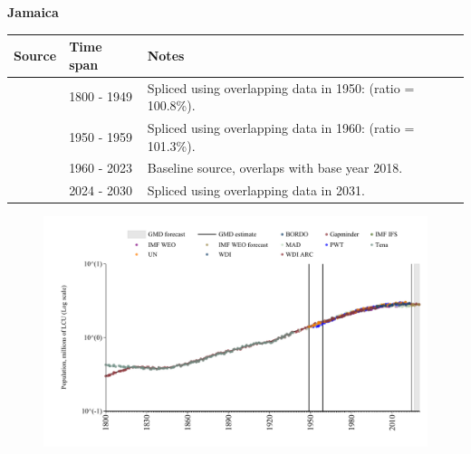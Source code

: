 \documentclass[12pt,a4paper,landscape]{article}
\begin{document}
\begin{adjustbox}{max totalsize={\paperwidth}{\paperheight},center}
\begin{minipage}[t][\textheight][t]{\textwidth}
\vspace*{0.5cm}
{}
\begin{center}
{\Large\bfseries Jamaica}
\end{center}
\vspace{0.5cm}
\begin{table}[H]
\centering
\small
\begin{tabular}{|l|l|l|}
\hline
\textbf{Source} & \textbf{Time span} & \textbf{Notes} \\
\hline
\rowcolor{white}\cite{Gapminder}& 1800 - 1949 &Spliced using overlapping data in 1950: (ratio = 100.8\%).\\
\rowcolor{lightgray}\cite{IMF_IFS}& 1950 - 1959 &Spliced using overlapping data in 1960: (ratio = 101.3\%).\\
\rowcolor{white}\cite{WDI}& 1960 - 2023 &Baseline source, overlaps with base year 2018.\\
\rowcolor{lightgray}\cite{Gapminder}& 2024 - 2030 &Spliced using overlapping data in 2031.\\
\hline
\end{tabular}
\end{table}
\begin{figure}[H]
\centering
\includegraphics[width=\textwidth,height=0.6\textheight,keepaspectratio]{graphs/JAM_pop.pdf}
\end{figure}
\end{minipage}
\end{adjustbox}
\end{document}
